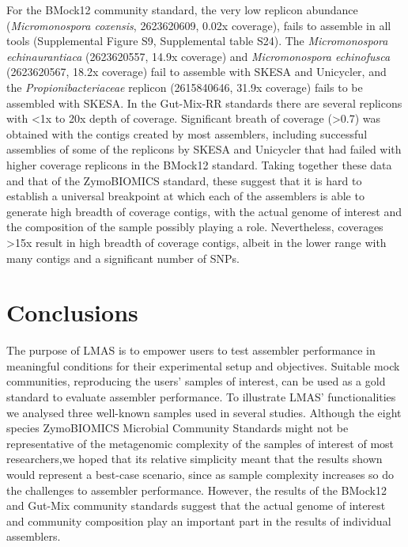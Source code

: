For the BMock12 community standard, the very low replicon abundance (\textit{Micromonospora coxensis}, 2623620609, 0.02x coverage), fails to assemble in all tools (Supplemental Figure S9, Supplemental table S24). The \textit{Micromonospora echinaurantiaca} (2623620557, 14.9x coverage) and \textit{Micromonospora echinofusca} (2623620567, 18.2x coverage) fail to assemble with SKESA and Unicycler, and the \textit{Propionibacteriaceae} replicon (2615840646, 31.9x coverage) fails to be assembled with SKESA. In the Gut-Mix-RR standards there are several replicons with <1x to 20x depth of coverage. Significant breath of coverage (>0.7) was obtained with the contigs created by most assemblers, including successful assemblies of some of the replicons by SKESA and Unicycler that had failed with higher coverage replicons in the BMock12 standard. Taking together these data and that of the ZymoBIOMICS standard, these suggest that it is hard to establish a universal breakpoint at which each of the assemblers is able to generate high breadth of coverage contigs, with the actual genome of interest and the composition of the sample possibly playing a role. Nevertheless, coverages >15x result in high breadth of coverage contigs, albeit in the lower range with many contigs and a significant number of SNPs.

\section{Conclusions}

The purpose of LMAS is to empower users to test assembler performance in meaningful conditions for their experimental setup and objectives. Suitable mock communities, reproducing the users’ samples of interest, can be used as a gold standard to evaluate assembler performance. To illustrate LMAS’ functionalities we analysed three well-known samples used in several studies. Although the eight species ZymoBIOMICS Microbial Community Standards might not be representative of the metagenomic complexity of the samples of interest of most researchers,we hoped that its relative simplicity meant that the results shown would represent a best-case scenario, since as sample complexity increases so do the challenges to assembler performance. However, the results of the BMock12 and Gut-Mix community standards suggest that the actual genome of interest and community composition play an important part in the results of individual assemblers. 

